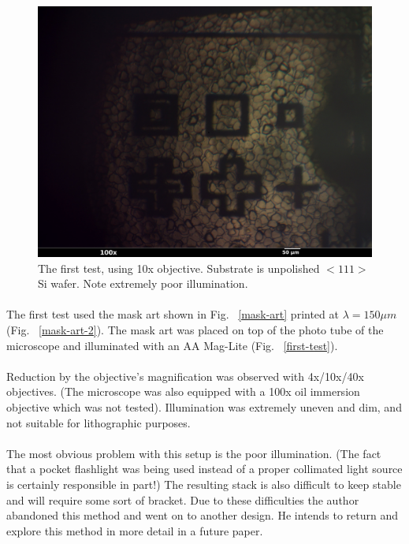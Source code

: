 \documentclass[twocolumn]{article}
\begin{document}
\begin{figure}[h]
\begin{center}
\includegraphics[scale=0.06]{mask001_annotated.jpg}
\end{center}
\caption{The first test, using 10x objective. Substrate is unpolished $<111>$ Si wafer. Note extremely poor
illumination.}
\label{first-test-close}
\end{figure}

\paragraph*{}
The first test used the mask art shown in Fig. ~\ref{mask-art} printed at $\lambda = 150 \mu m$ (Fig.
~\ref{mask-art-2}). The mask art was placed on top of the photo tube of the microscope and illuminated with an AA
Mag-Lite (Fig. ~\ref{first-test}).

\paragraph*{}
Reduction by the objective's magnification was observed with 4x/10x/40x objectives. (The microscope was also equipped
with a 100x oil immersion objective which was not tested). Illumination was extremely uneven and dim, and not suitable
for lithographic purposes.

\paragraph*{}
The most obvious problem with this setup is the poor illumination. (The fact that a pocket flashlight was being used
instead of a proper collimated light source is certainly responsible in part!) The resulting stack is also difficult
to keep stable and will require some sort of bracket. Due to these difficulties the author abandoned this method
and went on to another design. He intends to return and explore this method in more detail in a future paper.
\end{document}
